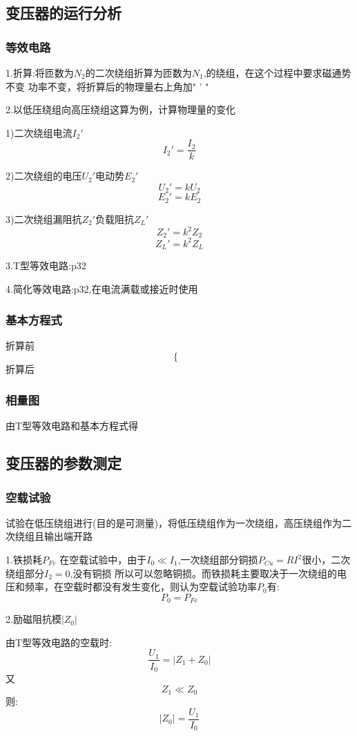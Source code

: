 \documentclass[11pt,twoside,a4paper]{ctexart}
\begin{document}
\subsection{变压器的运行分析}
\subsubsection{等效电路}
1.折算:将匝数为$N_2 $的二次绕组折算为匝数为$N_1$,的绕组，在这个过程中要求磁通势不变
功率不变，将折算后的物理量右上角加" ' "

2.以低压绕组向高压绕组这算为例，计算物理量的变化

1)二次绕组电流$I_2' $
\[I_2' = \frac{I_2}{k} \]

2)二次绕组的电压$U_2' $电动势$E_2' $
\[U_2' = kU_2 \]
\[E_2' = kE_2\]

3)二次绕组漏阻抗$Z_2' $负载阻抗$Z_L' $
\[Z_2' = k^2Z_2 \]
\[Z_L' = k^2Z_L \]

3.T型等效电路:p32

4.简化等效电路:p32,在电流满载或接近时使用




\subsubsection{基本方程式}
折算前
\[\begin{cases}
    
\end{cases}\]
折算后
\subsubsection{相量图}
由T型等效电路和基本方程式得
\subsection{变压器的参数测定}
\subsubsection{空载试验}
试验在低压绕组进行(目的是可测量)，将低压绕组作为一次绕组，高压绕组作为二次绕组且输出端开路

1.铁损耗$P_{Fe} $
在空载试验中，由于$I_0 \ll I_1$,一次绕组部分铜损$P_{Cu} = RI^2 $很小，二次绕组部分$I_2 = 0 $,没有铜损
所以可以忽略铜损。而铁损耗主要取决于一次绕组的电压和频率，在空载时都没有发生变化，则认为空载试验功率$P_0 $有:
\[P_0 = P_{Fe} \]

2.励磁阻抗模$|Z_0| $

由T型等效电路的空载时:
\[\frac{U_1}{I_0} = |Z_1 + Z_0| \]
又
\[Z_1 \ll Z_0 \]
则:
\[|Z_0| = \frac{U_1}{I_0} \]
\end{document}
